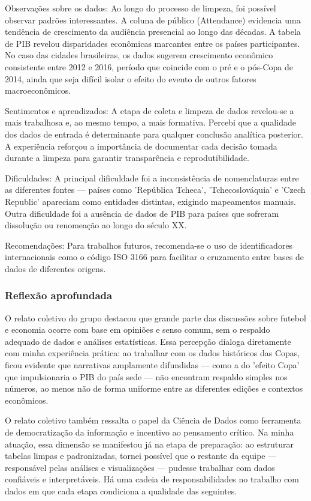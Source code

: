 \documentclass[12pt, a4paper, brazil]{article}
\begin{document}
Observações sobre os dados: Ao longo do processo de limpeza, foi possível observar padrões interessantes. A coluna de público (Attendance) evidencia uma tendência de crescimento da audiência presencial ao longo das décadas. A tabela de PIB revelou disparidades econômicas marcantes entre os países participantes. No caso das cidades brasileiras, os dados sugerem crescimento econômico consistente entre 2012 e 2016, período que coincide com o pré e o pós-Copa de 2014, ainda que seja difícil isolar o efeito do evento de outros fatores macroeconômicos.

Sentimentos e aprendizados: A etapa de coleta e limpeza de dados revelou-se a mais trabalhosa e, ao mesmo tempo, a mais formativa. Percebi que a qualidade dos dados de entrada é determinante para qualquer conclusão analítica posterior. A experiência reforçou a importância de documentar cada decisão tomada durante a limpeza para garantir transparência e reprodutibilidade.

Dificuldades: A principal dificuldade foi a inconsistência de nomenclaturas entre as diferentes fontes — países como 'República Tcheca', 'Tchecoslováquia' e 'Czech Republic' apareciam como entidades distintas, exigindo mapeamentos manuais. Outra dificuldade foi a ausência de dados de PIB para países que sofreram dissolução ou renomeação ao longo do século XX.

Recomendações: Para trabalhos futuros, recomenda-se o uso de identificadores internacionais como o código ISO 3166 para facilitar o cruzamento entre bases de dados de diferentes origens.

\subsubsection{Reflexão aprofundada}
O relato coletivo do grupo destacou que grande parte das discussões sobre futebol e economia ocorre com base em opiniões e senso comum, sem o respaldo adequado de dados e análises estatísticas. Essa percepção dialoga diretamente com minha experiência prática: ao trabalhar com os dados históricos das Copas, ficou evidente que narrativas amplamente difundidas — como a do 'efeito Copa' que impulsionaria o PIB do país sede — não encontram respaldo simples nos números, ao menos não de forma uniforme entre as diferentes edições e contextos econômicos.

O relato coletivo também ressalta o papel da Ciência de Dados como ferramenta de democratização da informação e incentivo ao pensamento crítico. Na minha atuação, essa dimensão se manifestou já na etapa de preparação: ao estruturar tabelas limpas e padronizadas, tornei possível que o restante da equipe — responsável pelas análises e visualizações — pudesse trabalhar com dados confiáveis e interpretáveis. Há uma cadeia de responsabilidades no trabalho com dados em que cada etapa condiciona a qualidade das seguintes.
\end{document}
